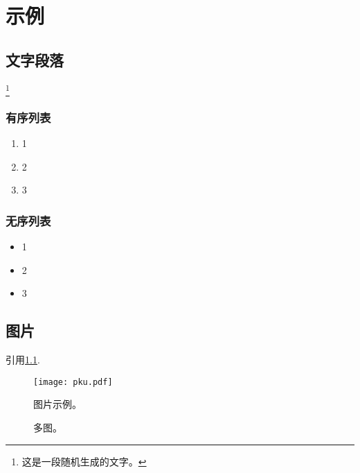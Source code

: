 \chapter{示例}

\thispagestyle{fancy}



\section{文字段落}


\lipsum[1]\footnote{这是一段随机生成的文字。}

\subsection{有序列表}

\begin{enumerate}
   \item 1
   \item 2
   \item 3
\end{enumerate}

\subsection{无序列表}

\begin{itemize}
   \item 1
   \item 2
   \item 3
\end{itemize}


\section{图片}

引用\cref{fig:1}.

\begin{figure}[htp]
   \centering
   \texttt{[image: pku.pdf]}
   \caption{图片示例。}
   \label{fig:1}
\end{figure}

\begin{figure}%
   \centering
   \quad
   \caption{多图。}
   \label{fig:2}
\end{figure}



